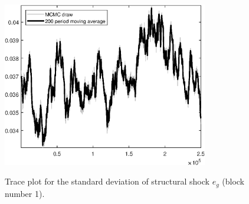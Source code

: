 \begin{figure}[H]
\centering
  \includegraphics[width=0.8\textwidth]{BRS_growth_ext_util/graphs/TracePlot_SE_e_g_blck_1}\\
    \caption{Trace plot for the standard deviation of structural shock ${e_g}$ (block number 1).}
\end{figure}
